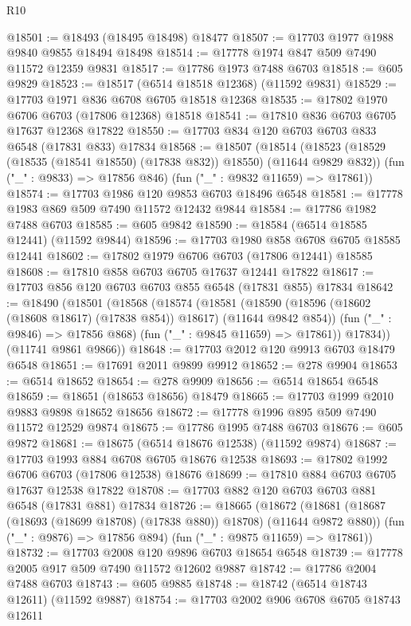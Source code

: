 \begin{lexlean}{R10}
\begin{coremodule}
{{{{{{{{{{{{{{{{{{{{{{{{{{{{{{{{{{{{{{{{{{{{{{{{{{{{{{{{{{{{{{{{{{{{{{{{{{{{{{{{{{{{@18501 := @18493 (@18495 @18498) @18477
@18507 := @17703 @1977 @1988 @9840 @9855 @18494 @18498
@18514 := @17778 @1974 @847 @509 @7490 @11572 @12359 @9831
@18517 := @17786 @1973 @7488 @6703
@18518 := @605 @9829
@18523 := @18517 (@6514 @18518 @12368) (@11592 @9831)
@18529 := @17703 @1971 @836 @6708 @6705 @18518 @12368
@18535 := @17802 @1970 @6706 @6703 (@17806 @12368) @18518
@18541 := @17810 @836 @6703 @6705 @17637 @12368 @17822
@18550 := @17703 @834 @120 @6703 @6703 @833 @6548 (@17831 @833) @17834
@18568 := @18507
    (@18514
      (@18523 (@18529 (@18535 (@18541 @18550) (@17838 @832)) @18550) (@11644 @9829 @832))
      (fun ("_" : @9833) => @17856 @846)
      (fun ("_" : @9832 @11659) => @17861))
@18574 := @17703 @1986 @120 @9853 @6703 @18496 @6548
@18581 := @17778 @1983 @869 @509 @7490 @11572 @12432 @9844
@18584 := @17786 @1982 @7488 @6703
@18585 := @605 @9842
@18590 := @18584 (@6514 @18585 @12441) (@11592 @9844)
@18596 := @17703 @1980 @858 @6708 @6705 @18585 @12441
@18602 := @17802 @1979 @6706 @6703 (@17806 @12441) @18585
@18608 := @17810 @858 @6703 @6705 @17637 @12441 @17822
@18617 := @17703 @856 @120 @6703 @6703 @855 @6548 (@17831 @855) @17834
@18642 := @18490
    (@18501
      (@18568
        (@18574
          (@18581
            (@18590 (@18596 (@18602 (@18608 @18617) (@17838 @854)) @18617) (@11644 @9842 @854))
            (fun ("_" : @9846) => @17856 @868)
            (fun ("_" : @9845 @11659) => @17861))
          @17834))
      (@11741 @9861 @9866))
@18648 := @17703 @2012 @120 @9913 @6703 @18479 @6548
@18651 := @17691 @2011 @9899 @9912
@18652 := @278 @9904
@18653 := @6514 @18652
@18654 := @278 @9909
@18656 := @6514 @18654 @6548
@18659 := @18651 (@18653 @18656) @18479
@18665 := @17703 @1999 @2010 @9883 @9898 @18652 @18656
@18672 := @17778 @1996 @895 @509 @7490 @11572 @12529 @9874
@18675 := @17786 @1995 @7488 @6703
@18676 := @605 @9872
@18681 := @18675 (@6514 @18676 @12538) (@11592 @9874)
@18687 := @17703 @1993 @884 @6708 @6705 @18676 @12538
@18693 := @17802 @1992 @6706 @6703 (@17806 @12538) @18676
@18699 := @17810 @884 @6703 @6705 @17637 @12538 @17822
@18708 := @17703 @882 @120 @6703 @6703 @881 @6548 (@17831 @881) @17834
@18726 := @18665
    (@18672
      (@18681 (@18687 (@18693 (@18699 @18708) (@17838 @880)) @18708) (@11644 @9872 @880))
      (fun ("_" : @9876) => @17856 @894)
      (fun ("_" : @9875 @11659) => @17861))
@18732 := @17703 @2008 @120 @9896 @6703 @18654 @6548
@18739 := @17778 @2005 @917 @509 @7490 @11572 @12602 @9887
@18742 := @17786 @2004 @7488 @6703
@18743 := @605 @9885
@18748 := @18742 (@6514 @18743 @12611) (@11592 @9887)
@18754 := @17703 @2002 @906 @6708 @6705 @18743 @12611
}}}}}}}}}}}}}}}}}}}}}}}}}}}}}}}}}}}}}}}}}}}}}}}}}}}}}}}}}}}}}}}}}}}}}}}}}}}}}}}}}}}}
\end{coremodule}
\end{lexlean}
